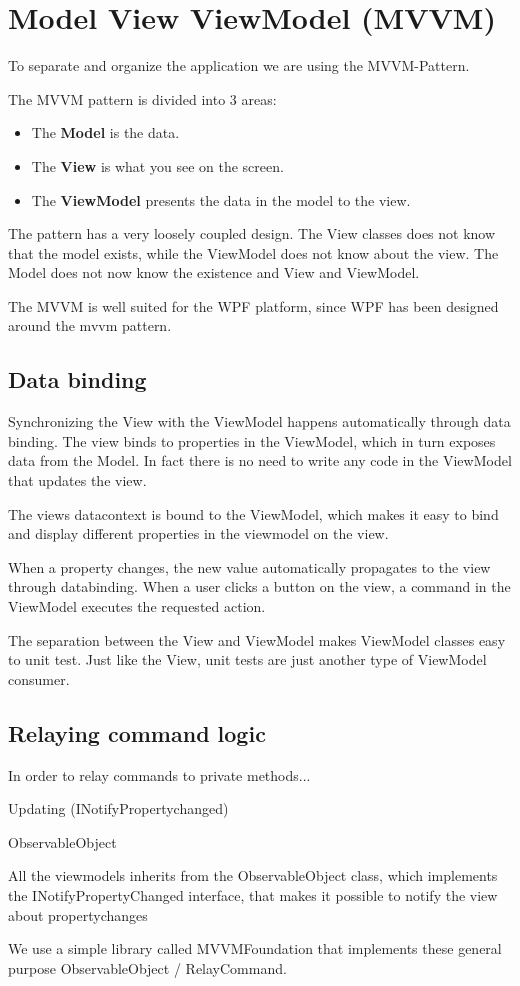 \chapter{Model View ViewModel (MVVM)}\label{MVVMSection}
To separate and organize the application we are using the MVVM-Pattern.

The MVVM pattern is divided into 3 areas:

\begin{itemize}
	\item The \textbf{Model} is the data.
	\item The \textbf{View} is what you see on the screen.
	\item The \textbf{ViewModel} presents the data in the model to the view.
\end{itemize}

The pattern has a very loosely coupled design.
The View classes does not know that the model exists, while the ViewModel does not know about the view. The Model does not now know the existence and View and ViewModel.

The MVVM is well suited for the WPF platform, since WPF has been designed around the mvvm pattern.

\section{Data binding}
Synchronizing the View with the ViewModel happens automatically through data binding.
The view binds to properties in the ViewModel, which in turn exposes data from the Model. In fact there is no need to write any code in the ViewModel that updates the view.

The views datacontext is bound to the ViewModel, which makes it easy to bind and display different properties in the viewmodel on the view.

When a property changes, the new value automatically propagates to the view through databinding.
When a user clicks a button on the view, a command in the ViewModel executes the requested action.

The separation between the View and ViewModel makes ViewModel classes easy to unit test. Just like the View, unit tests are just another type of ViewModel consumer.

\section{Relaying command logic}
In order to relay commands to private methods...

Updating (INotifyPropertychanged)

ObservableObject 

All the viewmodels inherits from the ObservableObject class, which implements the INotifyPropertyChanged interface, that makes it possible to notify the view about propertychanges

We use a simple library called MVVMFoundation that implements these general purpose ObservableObject / RelayCommand.